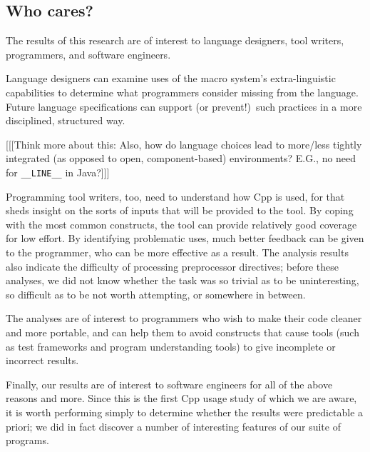 \documentclass[11pt]{article}
\begin{document}
%


\subsection{Who cares?}

The results of this research are of interest to language designers, tool
writers, programmers, and software engineers.

Language designers can examine uses of the macro system's extra-linguistic
capabilities to determine what programmers consider missing from the
language.  Future language specifications can support (or prevent!)\ such
practices in a more disciplined, structured way.

[[[Think more about this:  Also, how do language choices lead to more/less
tightly integrated (as opposed to open, component-based) environments?
E.G., no need for \verb|__LINE__| in Java?]]]

Programming tool writers, too, need to understand how Cpp is used, for that
sheds insight on the sorts of inputs that will be provided to the tool.  By
coping with the most common constructs, the tool can provide relatively
good coverage for low effort.  By identifying problematic uses, much better
feedback can be given to the programmer, who can be more effective as a
result.  The analysis results also indicate the difficulty of processing
preprocessor directives; before these analyses, we did not know whether the
task was so trivial as to be uninteresting, so difficult as to be not worth
attempting, or somewhere in between.

The analyses are of interest to programmers who wish to make their code
cleaner and more portable, and can help them to avoid constructs that cause
tools (such as test frameworks and program understanding tools)
to give incomplete or incorrect results.


Finally, our results are of interest to software engineers for all of the
above reasons and more.  Since this is the first Cpp usage study of which
we are aware, it is worth performing simply to determine whether the
results were predictable a priori; we did in fact discover a number of
interesting features of our suite of programs.
\end{document}

